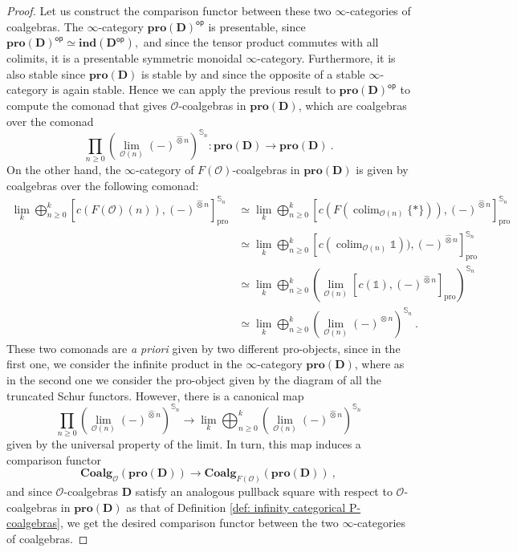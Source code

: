 \documentclass[a4paper,12pt]{amsart}
\DeclareMathOperator*{\colim}{colim}
\theoremstyle{plain}
\theoremstyle{definition}
\theoremstyle{remark}
\begin{document}
\begin{proof}
Let us construct the comparison functor between these two $\infty$-categories of coalgebras. The $\infty$-category $\mathbf{pro}(\mathbf{D})^{\mathsf{op}}$ is presentable, since 
$
\mathbf{pro}(\mathbf{D})^{\mathsf{op}} \simeq \mathbf{ind}(\mathbf{D}^{\mathsf{op}}), 
$ and since the tensor product commutes with all colimits, it is a presentable symmetric monoidal $\infty$-category. Furthermore, it is also stable since $\mathbf{pro}(\mathbf{D})$ is stable by \cite[Lemma 2.5]{Ktheorynonarch} and since the opposite of a stable $\infty$-category is again stable. Hence we can apply the previous result to $\mathbf{pro}(\mathbf{D})^{\mathsf{op}}$ to compute the comonad that gives $\mathscr{O}$-coalgebras in $\mathbf{pro}(\mathbf{D})$, which are coalgebras over the comonad 
\[
\prod_{n \geq 0} \left(\lim_{\mathscr{O}(n)} (-)^{\widehat{\otimes} n} \right)^{\mathbb{S}_n}: \mathbf{pro}(\mathbf{D}) \longrightarrow \mathbf{pro}(\mathbf{D})~.
\]
On the other hand, the $\infty$-category of $F(\mathscr{O})$-coalgebras in $\mathbf{pro}(\mathbf{D})$ is given by coalgebras over the following comonad: \begin{align*}
\lim_k \bigoplus_{n \geq 0}^{k} \left[c(F(\mathscr{O})(n)),(-)^{\widehat{\otimes} n} \right]^{\mathbb{S}_n}_{\mathrm{pro}}  &\simeq \lim_k \bigoplus_{n \geq 0}^{k} \left[c(F(\colim_{\mathscr{O}(n)} \{*\})),(-)^{\widehat{\otimes} n} \right]^{\mathbb{S}_n}_{\mathrm{pro}} \\
&\simeq  \lim_k \bigoplus_{n \geq 0}^{k} \left[c(\colim_{\mathscr{O}(n)} \mathbb{1})),(-)^{\widehat{\otimes} n} \right]^{\mathbb{S}_n}_{\mathrm{pro}}\\
&\simeq \lim_k \bigoplus_{n \geq 0}^{k} \left(\lim_{\mathscr{O}(n)} \left[c(\mathbb{1}),(-)^{\widehat{\otimes} n} \right]_{\mathrm{pro}}\right)^{\mathbb{S}_n} \\
&\simeq \lim_k \bigoplus_{n \geq 0}^{k} \left(\lim_{\mathscr{O}(n)} (-)^{\widehat{\otimes} n}\right)^{\mathbb{S}_n}~. 
\end{align*}These two comonads are \textit{a priori} given by two different pro-objects, since in the first one, we consider the infinite product in the $\infty$-category $\mathbf{pro}(\mathbf{D})$, where as in the second one we consider the pro-object given by the diagram of all the truncated Schur functors. However, there is a canonical map 
\[
\prod_{n \geq 0} \left(\lim_{\mathscr{O}(n)} (-)^{\widehat{\otimes} n} \right)^{\mathbb{S}_n} \longrightarrow \lim_k\bigoplus_{n \geq 0}^{k}  \left(\lim_{\mathscr{O}(n)} (-)^{\widehat{\otimes} n}\right)^{\mathbb{S}_n}
\]
given by the universal property of the limit. In turn, this map induces a comparison functor 
\[
\mathbf{Coalg}_{\mathscr{O}}(\mathbf{pro}(\mathbf{D})) \longrightarrow \mathbf{Coalg}_{F(\mathscr{O})}(\mathbf{pro}(\mathbf{D}))~,
\]
and since $\mathscr{O}$-coalgebras $\mathbf{D}$ satisfy an analogous pullback square with respect to $\mathscr{O}$-coalgebras in $\mathbf{pro}(\mathbf{D})$ as that of Definition \ref{def: infinity categorical P-coalgebras}, we get the desired comparison functor between the two $\infty$-categories of coalgebras. 


\end{proof}
\end{document}

